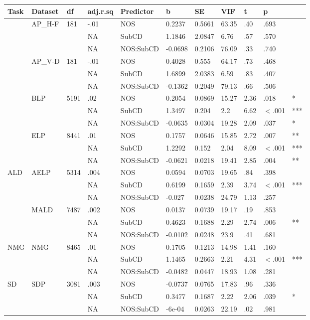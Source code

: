 \begin{table}[ht]
\centering
\begingroup\normalsize
\begin{tabular}{lllllllllll}
  \hline
Task & Dataset & df & adj.r.sq & Predictor & b & SE & VIF & t & p &  \\ 
  \hline
 & AP\_H-F & 181 & -.01 & NOS & 0.2237 & 0.5661 & 63.35 & .40 & .693 &   \\ 
   &  &  & NA & SubCD & 1.1846 & 2.0847 & 6.76 & .57 & .570 &   \\ 
   &  &  & NA & NOS:SubCD & -0.0698 & 0.2106 & 76.09 & .33 & .740 &   \\ 
   & AP\_V-D & 181 & -.01 & NOS & 0.4028 & 0.555 & 64.17 & .73 & .468 &   \\ 
   &  &  & NA & SubCD & 1.6899 & 2.0383 & 6.59 & .83 & .407 &   \\ 
   &  &  & NA & NOS:SubCD & -0.1362 & 0.2049 & 79.13 & .66 & .506 &   \\ 
   & BLP & 5191 & .02 & NOS & 0.2054 & 0.0869 & 15.27 & 2.36 & .018 & * \\ 
   &  &  & NA & SubCD & 1.3497 & 0.204 & 2.2 & 6.62 & $<$.001 & *** \\ 
   &  &  & NA & NOS:SubCD & -0.0635 & 0.0304 & 19.28 & 2.09 & .037 & * \\ 
   & ELP & 8441 & .01 & NOS & 0.1757 & 0.0646 & 15.85 & 2.72 & .007 & ** \\ 
   &  &  & NA & SubCD & 1.2292 & 0.152 & 2.04 & 8.09 & $<$.001 & *** \\ 
   &  &  & NA & NOS:SubCD & -0.0621 & 0.0218 & 19.41 & 2.85 & .004 & ** \\ 
  ALD & AELP & 5314 & .004 & NOS & 0.0594 & 0.0703 & 19.65 & .84 & .398 &   \\ 
   &  &  & NA & SubCD & 0.6199 & 0.1659 & 2.39 & 3.74 & $<$.001 & *** \\ 
   &  &  & NA & NOS:SubCD & -0.027 & 0.0238 & 24.79 & 1.13 & .257 &   \\ 
   & MALD & 7487 & .002 & NOS & 0.0137 & 0.0739 & 19.17 & .19 & .853 &   \\ 
   &  &  & NA & SubCD & 0.4623 & 0.1688 & 2.29 & 2.74 & .006 & ** \\ 
   &  &  & NA & NOS:SubCD & -0.0102 & 0.0248 & 23.9 & .41 & .681 &   \\ 
  NMG & NMG & 8465 & .01 & NOS & 0.1705 & 0.1213 & 14.98 & 1.41 & .160 &   \\ 
   &  &  & NA & SubCD & 1.1465 & 0.2663 & 2.21 & 4.31 & $<$.001 & *** \\ 
   &  &  & NA & NOS:SubCD & -0.0482 & 0.0447 & 18.93 & 1.08 & .281 &   \\ 
  SD & SDP & 3081 & .003 & NOS & -0.0737 & 0.0765 & 17.83 & .96 & .336 &   \\ 
   &  &  & NA & SubCD & 0.3477 & 0.1687 & 2.22 & 2.06 & .039 & * \\ 
   &  &  & NA & NOS:SubCD & -6e-04 & 0.0263 & 22.19 & .02 & .981 &   \\ 
   \hline
\end{tabular}
\endgroup
\end{table}
